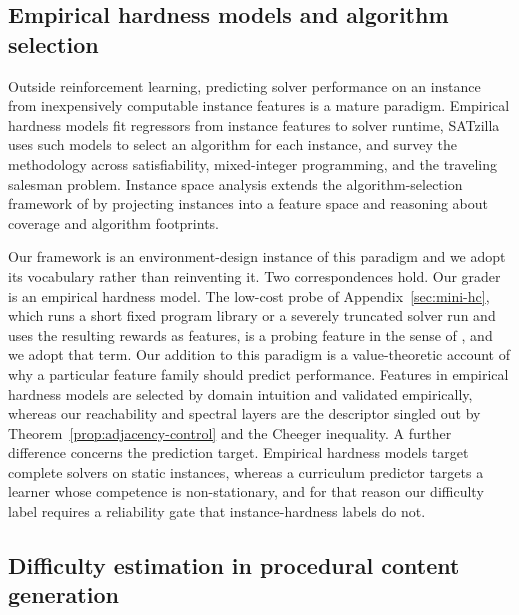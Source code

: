 \documentclass[twoside]{article}
\begin{document}
\subsection{Empirical hardness models and algorithm selection}

Outside reinforcement learning, predicting solver performance on an instance from inexpensively computable instance features is a mature paradigm. Empirical hardness models \citep{leytonbrown2002learning, leytonbrown2009empirical} fit regressors from instance features to solver runtime, SATzilla \citep{xu2008satzilla} uses such models to select an algorithm for each instance, and \citet{hutter2014algorithm} survey the methodology across satisfiability, mixed-integer programming, and the traveling salesman problem. Instance space analysis \citep{smithmiles2012measuring, smithmiles2014towards, munoz2020instance} extends the algorithm-selection framework of \citet{rice1976algorithm} by projecting instances into a feature space and reasoning about coverage and algorithm footprints.

Our framework is an environment-design instance of this paradigm and we adopt its vocabulary rather than reinventing it. Two correspondences hold. Our grader is an empirical hardness model. The low-cost probe of Appendix~\ref{sec:mini-hc}, which runs a short fixed program library or a severely truncated solver run and uses the resulting rewards as features, is a probing feature in the sense of \citet{hutter2014algorithm}, and we adopt that term. Our addition to this paradigm is a value-theoretic account of why a particular feature family should predict performance. Features in empirical hardness models are selected by domain intuition and validated empirically, whereas our reachability and spectral layers are the descriptor singled out by Theorem~\ref{prop:adjacency-control} and the Cheeger inequality. A further difference concerns the prediction target. Empirical hardness models target complete solvers on static instances, whereas a curriculum predictor targets a learner whose competence is non-stationary, and for that reason our difficulty label requires a reliability gate that instance-hardness labels do not.

\subsection{Difficulty estimation in procedural content generation}
\end{document}
